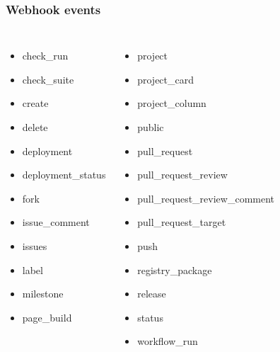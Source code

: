 \documentclass[gray]{beamer}
\begin{document}
\begin{frame}
 \frametitle{Webhook events}

 \href{https://docs.github.com/en/free-pro-team@latest/actions/reference/events-that-trigger-workflows}{}

 \begin{columns}
 \begin{itemize}
 \item check\_run
 \item check\_suite
 \item create
 \item delete
 \item deployment
 \item deployment\_status
 \item fork
 \item issue\_comment
 \item issues
 \item label
 \item milestone
 \item page\_build
 \end{itemize}

 \begin{itemize}
 \item project
 \item project\_card
 \item project\_column
 \item public
 \item pull\_request
 \item pull\_request\_review
 \item pull\_request\_review\_comment
 \item pull\_request\_target
 \item push
 \item registry\_package
 \item release
 \item status
 \item workflow\_run
 \end{itemize}
 \end{columns}
\end{frame}
\end{document}
